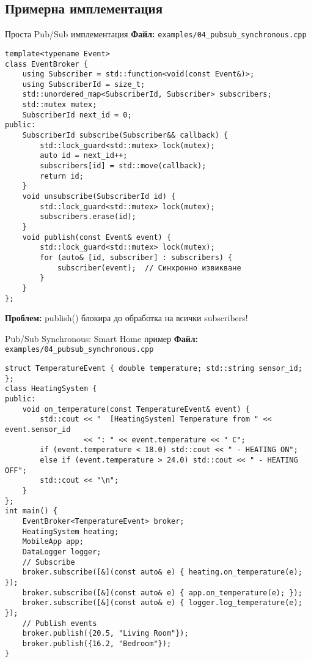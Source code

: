 \documentclass[aspectratio=169]{beamer}
\begin{document}
\subsection{Примерна имплементация}

\begin{frame}[fragile]{Проста Pub/Sub имплементация}
\textbf{Файл:} \texttt{examples/04\_pubsub\_synchronous.cpp}
\begin{lstlisting}[basicstyle=\ttfamily\tiny]
template<typename Event>
class EventBroker {
    using Subscriber = std::function<void(const Event&)>;
    using SubscriberId = size_t;
    std::unordered_map<SubscriberId, Subscriber> subscribers;
    std::mutex mutex;
    SubscriberId next_id = 0;
public:
    SubscriberId subscribe(Subscriber&& callback) {
        std::lock_guard<std::mutex> lock(mutex);
        auto id = next_id++;
        subscribers[id] = std::move(callback);
        return id;
    }
    void unsubscribe(SubscriberId id) {
        std::lock_guard<std::mutex> lock(mutex);
        subscribers.erase(id);
    }
    void publish(const Event& event) {
        std::lock_guard<std::mutex> lock(mutex);
        for (auto& [id, subscriber] : subscribers) {
            subscriber(event);  // Синхронно извикване
        }
    }
};
\end{lstlisting}

\textbf{Проблем:} publish() блокира до обработка на всички subscribers!
\end{frame}

\begin{frame}[fragile]{Pub/Sub Synchronous: Smart Home пример}
\textbf{Файл:} \texttt{examples/04\_pubsub\_synchronous.cpp}
\begin{lstlisting}[basicstyle=\ttfamily\tiny]
struct TemperatureEvent { double temperature; std::string sensor_id; };
class HeatingSystem {
public:
    void on_temperature(const TemperatureEvent& event) {
        std::cout << "  [HeatingSystem] Temperature from " << event.sensor_id 
                  << ": " << event.temperature << " C";
        if (event.temperature < 18.0) std::cout << " - HEATING ON";
        else if (event.temperature > 24.0) std::cout << " - HEATING OFF";
        std::cout << "\n";
    }
};
int main() {
    EventBroker<TemperatureEvent> broker;
    HeatingSystem heating;
    MobileApp app;
    DataLogger logger;
    // Subscribe
    broker.subscribe([&](const auto& e) { heating.on_temperature(e); });
    broker.subscribe([&](const auto& e) { app.on_temperature(e); });
    broker.subscribe([&](const auto& e) { logger.log_temperature(e); });
    // Publish events
    broker.publish({20.5, "Living Room"});
    broker.publish({16.2, "Bedroom"});
}
\end{lstlisting}
\end{frame}
\end{document}
